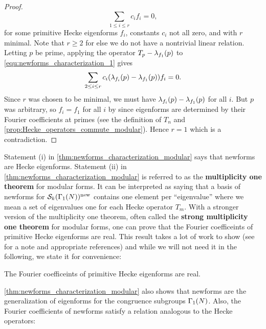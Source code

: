 \begin{proof}
        \begin{equation}\label{equ:newforms_characterization_1}
          \sum_{1 \le i \le r}c_{i}f_{i} = 0,
        \end{equation}
        for some primitive Hecke eigenforms $f_{i}$, constants $c_{i}$ not all zero, and with $r$ minimal. Note that $r \ge 2$ for else we do not have a nontrivial linear relation. Letting $p$ be prime, applying the operator $T_{p}-\lambda_{f_{1}}(p)$ to \cref{equ:newforms_characterization_1} gives
        \[
          \sum_{2 \le i \le r}c_{i}(\lambda_{f_{i}}(p)-\lambda_{f_{1}}(p))f_{i} = 0.
        \]
        Since $r$ was chosen to be minimal, we must have $\lambda_{f_{i}}(p)-\lambda_{f_{1}}(p)$ for all $i$. But $p$ was arbitrary, so $f_{i} = f_{1}$ for all $i$ by since eigenforms are determined by their Fourier coefficients at primes (see the definition of $T_{n}$ and \cref{prop:Hecke_operators_commute_modular}). Hence $r = 1$ which is a contradiction.
      \end{proof}

      Statement (i) in \cref{thm:newforms_characterization_modular} says that newforms are Hecke eigenforms. Statement (ii) in \cref{thm:newforms_characterization_modular} is referred to as the \textbf{multiplicity one theorem} for modular forms. It can be interpreted as saying that a basis of newforms for $\mathcal{S}_{k}(\Gamma_{1}(N))^{\mathrm{new}}$ contains one element per ``eigenvalue'' where we mean a set of eigenvalues one for each Hecke operator $T_{m}$. With a stronger version of the multiplicity one theorem, often called the \textbf{strong multiplicity one theorem} for modular forms, one can prove that the Fourier coefficeints of primitive Hecke eigenforms are real. This result takes a lot of work to show (see \cite{diamond2005first} for a note and appropriate references) and while we will not need it in the following, we state it for convenience:

      \begin{theorem}
        The Fourier coefficeints of primitive Hecke eigenforms are real.
      \end{theorem}
      
        \cref{thm:newforms_characterization_modular} also shows that newforms are the generalization of eigenforms for the congruence subgroups $\Gamma_{1}(N)$. Also, the Fourier coefficients of newforms satisfy a relation analogous to the Hecke operators:

